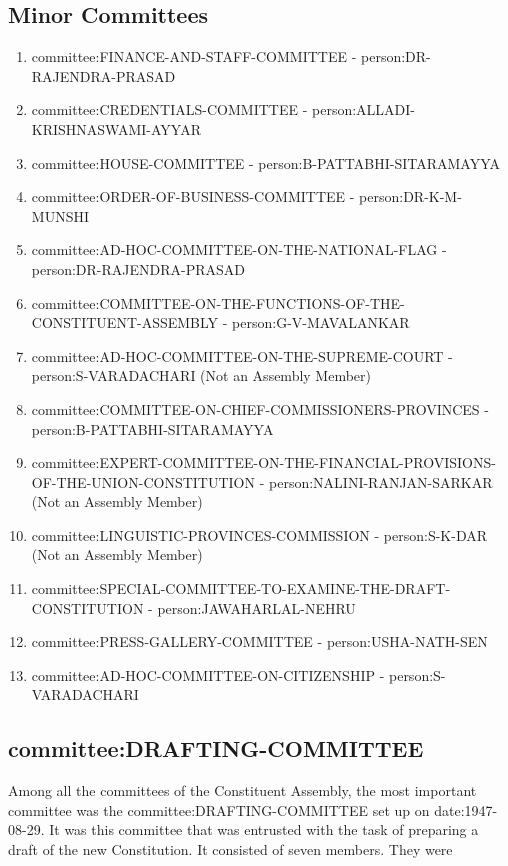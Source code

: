 \subsection{Minor Committees}

\begin{enumerate}
  \item \gls{committee:FINANCE-AND-STAFF-COMMITTEE} - \gls{person:DR-RAJENDRA-PRASAD}
  \item \gls{committee:CREDENTIALS-COMMITTEE} - \gls{person:ALLADI-KRISHNASWAMI-AYYAR}
  \item \gls{committee:HOUSE-COMMITTEE} - \gls{person:B-PATTABHI-SITARAMAYYA}
  \item \gls{committee:ORDER-OF-BUSINESS-COMMITTEE} - \gls{person:DR-K-M-MUNSHI}
  \item \gls{committee:AD-HOC-COMMITTEE-ON-THE-NATIONAL-FLAG} - \gls{person:DR-RAJENDRA-PRASAD}
  \item \gls{committee:COMMITTEE-ON-THE-FUNCTIONS-OF-THE-CONSTITUENT-ASSEMBLY} - \gls{person:G-V-MAVALANKAR}
  \item \gls{committee:AD-HOC-COMMITTEE-ON-THE-SUPREME-COURT} - \gls{person:S-VARADACHARI} (Not an Assembly Member)
  \item \gls{committee:COMMITTEE-ON-CHIEF-COMMISSIONERS-PROVINCES} - \gls{person:B-PATTABHI-SITARAMAYYA}
  \item \gls{committee:EXPERT-COMMITTEE-ON-THE-FINANCIAL-PROVISIONS-OF-THE-UNION-CONSTITUTION} - \gls{person:NALINI-RANJAN-SARKAR} (Not an Assembly Member)
  \item \gls{committee:LINGUISTIC-PROVINCES-COMMISSION} - \gls{person:S-K-DAR} (Not an Assembly Member)
  \item \gls{committee:SPECIAL-COMMITTEE-TO-EXAMINE-THE-DRAFT-CONSTITUTION} - \gls{person:JAWAHARLAL-NEHRU}
  \item \gls{committee:PRESS-GALLERY-COMMITTEE} - \gls{person:USHA-NATH-SEN}
  \item \gls{committee:AD-HOC-COMMITTEE-ON-CITIZENSHIP} - \gls{person:S-VARADACHARI}
\end{enumerate}


\subsection{\gls{committee:DRAFTING-COMMITTEE}}

Among all the committees of the Constituent Assembly, the most important committee was the \gls{committee:DRAFTING-COMMITTEE} set up on \gls{date:1947-08-29}. It was this committee that was entrusted with the task of preparing a draft of the new Constitution. It consisted of seven members. They were


